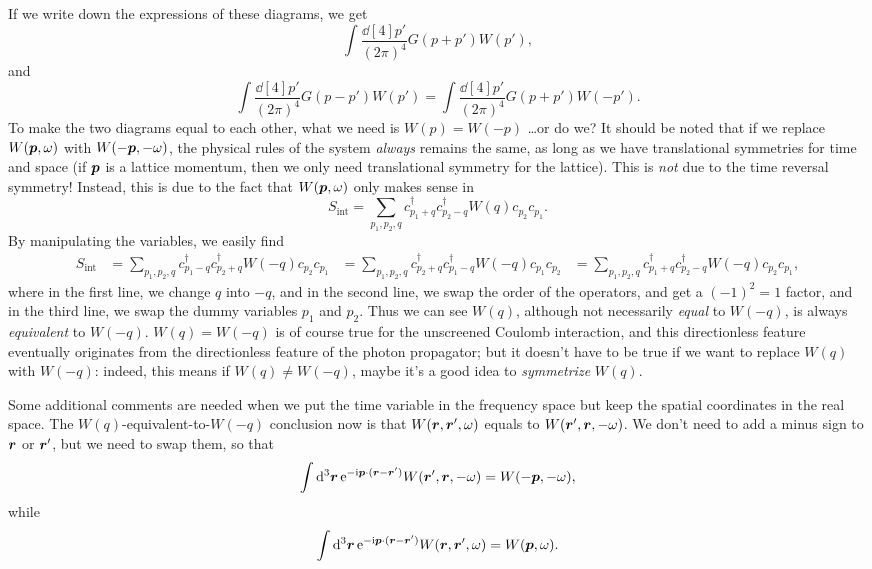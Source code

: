 \documentclass[hyperref, a4paper, 12pt]{report}
\newcommand*{\ii}{\mathrm{i}}
\newcommand*{\ee}{\mathrm{e}}
\def\\{}%
\begin{document}
If we write down the expressions of these diagrams, 
we get 
\[
    \int \frac{\dd[4]{p'}}{(2\pi)^4} G(p + p') W(p'),
\] 
and 
\[
    \int \frac{\dd[4]{p'}}{(2\pi)^4} G(p - p') W(p')
    = \int \frac{\dd[4]{p'}}{(2\pi)^4} G(p + p') W(- p').
\]
To make the two diagrams equal to each other, 
what we need is $W(p) = W(- p)$ \dots or do we?
It should be noted that if we replace 
$W(\vb*{p}, \omega)$ with $W(- \vb*{p}, - \omega)$,
the physical rules of the system \emph{always} remains the same,
as long as we have translational symmetries for time and space 
(if $\vb*{p}$ is a lattice momentum,
then we only need translational symmetry for the lattice).
This is \emph{not} due to the time reversal symmetry!
Instead, this is due to the fact that $W(\vb*{p}, \omega)$
only makes sense in 
\[
    S_{\text{int}} = \sum_{p_1, p_2, q} 
    c^\dagger_{p_1 + q } c^\dagger_{p_2 - q} W(q) c_{p_2} c_{p_1}.
\]
By manipulating the variables, we easily find 
\[
    \begin{aligned}
        S_{\text{int}} &= 
        \sum_{p_1, p_2, q} 
        c^\dagger_{p_1 - q } c^\dagger_{p_2 + q} W(-q) c_{p_2} c_{p_1} \\
        &= \sum_{p_1, p_2, q} 
        c^\dagger_{p_2 + q} c^\dagger_{p_1 - q } W(-q) c_{p_1} c_{p_2} \\
        &= \sum_{p_1, p_2, q} 
        c^\dagger_{p_1 + q} c^\dagger_{p_2 - q } W(-q) c_{p_2} c_{p_1},
    \end{aligned}
\]
where in the first line, 
we change $q$ into $-q$,
and in the second line, we swap the order of the operators, 
and get a $(-1)^2 = 1$ factor,
and in the third line, 
we swap the dummy variables $p_1$ and $p_2$.
Thus we can see $W(q)$, although not necessarily \emph{equal} to $W(-q)$,
is always \emph{equivalent} to $W(-q)$.
$W(q) = W(-q)$ is of course true for the unscreened Coulomb interaction,
and this directionless feature eventually originates from 
the directionless feature of the photon propagator;
but it doesn't have to be true 
if we want to replace $W(q)$ with $W(-q)$:
indeed, this means if $W(q) \neq W(-q)$,
maybe it's a good idea to \emph{symmetrize} $W(q)$.

Some additional comments are needed when we put the time variable in the frequency space 
but keep the spatial coordinates in the real space.
The $W(q)$-equivalent-to-$W(-q)$ conclusion 
now is that $W(\vb*{r}, \vb*{r}', \omega)$ equals to 
$W(\vb*{r}', \vb*{r}, - \omega)$.
We don't need to add a minus sign to $\vb*{r}$ or $\vb*{r}'$,
but we need to swap them,
so that 
\[
    \int \dd[3]{\vb*{r}} \ee^{- \ii \vb*{p} \cdot (\vb*{r} - \vb*{r}')} W(\vb*{r}', \vb*{r}, - \omega)
    = W(- \vb*{p}, - \omega) ,
\]
while 
\[
    \int \dd[3]{\vb*{r}} \ee^{- \ii \vb*{p} \cdot (\vb*{r} - \vb*{r}')} W(\vb*{r}, \vb*{r}', \omega)
    = W(\vb*{p}, \omega).
\]
\end{document}

